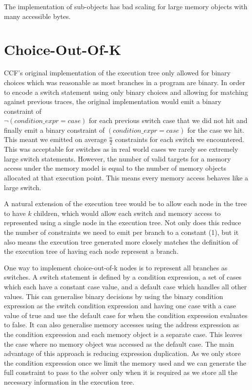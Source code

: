 \documentclass[12pt,twoside]{report}
\begin{document}
The implementation of sub-objects has bad scaling for large memory objects with many accessible bytes.



\section{Choice-Out-Of-K}

CCF's original implementation of the execution tree only allowed for binary choices which was reasonable as most branches in a program are binary. In order to encode a switch statement using only binary choices and allowing for matching against previous traces, the original implementation would emit a binary constraint of \\$\neg{(condition\_expr = case)}$ for each previous switch case that we did not hit and finally emit a binary constraint of $(condition\_expr = case)$ for the case we hit. This meant we emitted on average $\frac{n}{2}$ constraints for each switch we encountered. This was acceptable for switches as in real world cases we rarely see extremely large switch statements. However, the number of valid targets for a memory access under the memory model is equal to the number of memory objects allocated at that execution point. This means every memory access behaves like a large switch.

A natural extension of the execution tree would be to allow each node in the tree to have $k$ children, which would allow each switch and memory access to represented using a single node in the execution tree. Not only does this reduce the number of constraints we need to emit per branch to a constant (1), but it also means the execution tree generated more closely matches the definition of the execution tree of having each node represent a branch.

One way to implement choice-out-of-k nodes is to represent all branches as switches. A switch statement is defined by a condition expression, a set of cases which each have a constant case value, and a default case which handles all other values. This can generalise binary decisions by using the binary condition expression as the switch condition expression and having one case with a case value of true and use the default case for when the condition expression evaluates to false. It can also generalise memory accesses using the address expression as the condition expression and each memory object is a separate case. This leaves the case where no memory object was accessed as the default case. The main advantage of this approach is reducing expression duplication. As we only store the condition expression once we limit the memory used and we can generate the full constraint to pass to the solver only when it is required as we store all the necessary information in the execution tree.
\end{document}
